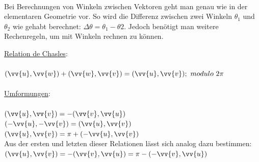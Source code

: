         \paragraph{} Bei Berechnungen von Winkeln zwischen Vektoren geht man genau wie in der elementaren Geometrie vor. So wird die Differenz zwischen zwei Winkeln $\theta_{1}$ und $\theta_{2}$ wie gehabt berechnet: $\Delta\theta = \theta_{1} - \theta{2}$. Jedoch benötigt man weitere Rechenregeln, um mit Winkeln rechnen zu können.
        \\
        \begin{Theorem}
            \underline{Relation de Chasles}: \\\\
            $(\vv{u},\vv{w})+(\vv{w},\vv{v})=(\vv{u},\vv{v});\text{ }modulo\text{ }2\pi$ \\\\
            \underline{Umformungen}: \\\\
            $(\vv{u},\vv{v})=-(\vv{v},\vv{u})$ \\
            $(-\vv{u},-\vv{v})=(\vv{u},\vv{v})$ \\
            $(\vv{u},\vv{v})=\pi+(-\vv{u},\vv{v})$ \\
            Aus der ersten und letzten dieser Relationen lässt sich analog dazu bestimmen: \\
            $(\vv{u},\vv{v})=-(\vv{v},\vv{u})=\pi-(-\vv{v},\vv{u})$
        \end{Theorem}

        \\
        \\
        \\

